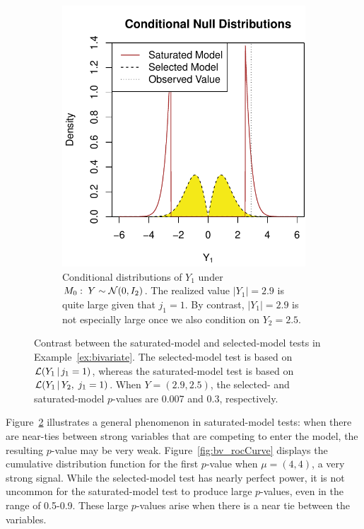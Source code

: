 \documentclass{article}
\begin{document}
\begin{figure}
\begin{subfigure}[t]{.4\textwidth}
    \includegraphics[width=\textwidth]{figs/bivariateSelVSat_nullDists.pdf}
    \caption{Conditional distributions of $Y_1$ under
      $M_0:\; Y \sim \mathcal{N}(0,I_2)$. The realized value $|Y_1|=2.9$ is
      quite large given that $j_1=1$. By
      contrast, $|Y_1|=2.9$ is not especially large once we 
      also condition on $Y_2=2.5$.}
  \label{fig:bv_nullDists}
  \end{subfigure}
  \caption{Contrast between the saturated-model and selected-model
    tests in Example~\ref{ex:bivariate}. The selected-model test is based on  $\mathcal{L}(Y_1 \,|\, j_1=1)$,  whereas the saturated-model test is based on $\mathcal{L}(Y_1  \,|\, Y_2, \; j_1=1)$. 
    When $Y=(2.9, 2.5)$, the selected- and saturated-model $p$-values are 0.007 and 0.3, respectively.}
  \label{fig:bv}
\end{figure}

Figure~\ref{fig:bv} illustrates a general phenomenon in saturated-model tests: when there are near-ties between strong variables that are competing to enter the model, the resulting $p$-value may be very weak. Figure~\ref{fig:bv_rocCurve} displays the cumulative distribution function for the first $p$-value when $\mu=(4,4)$, a very strong signal. While the selected-model test has nearly perfect power, it is not uncommon for the saturated-model test to produce large $p$-values, even in the range of 0.5-0.9. These large $p$-values arise when there is a near tie between the variables.
\end{document}
